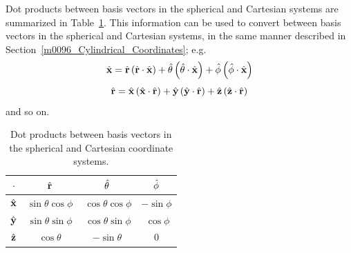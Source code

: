 Dot products between basis vectors in the spherical and Cartesian systems are summarized in Table~\ref{m0097_tBasisVectorConversion}.
This information can be used to convert between basis vectors in the spherical and Cartesian systems, in the same manner described in Section~\ref{m0096_Cylindrical_Coordinates}; e.g.
%
\begin{equation}
\hat{\bf x} = \hat{\bf r     }\left(\hat{\bf r     }\cdot\hat{\bf x}\right) 
             +\hat{\bf \theta}\left(\hat{\bf \theta}\cdot\hat{\bf x}\right)
             +\hat{\bf \phi  }\left(\hat{\bf \phi  }\cdot\hat{\bf x}\right)
\end{equation}
%
\begin{equation}
\hat{\bf r} = \hat{\bf x}\left(\hat{\bf x}\cdot\hat{\bf r}\right) 
             +\hat{\bf y}\left(\hat{\bf y}\cdot\hat{\bf r}\right)
             +\hat{\bf z}\left(\hat{\bf z}\cdot\hat{\bf r}\right)
\end{equation}
%
and so on.
% 
%
\begin{table}
\begin{center}
\begin{tabular}{c|ccc}
$\cdot$       & $\hat{\bf r}$ & $\hat{\bf \theta}$ & $\hat{\bf \phi}$ \\
\hline
$\hat{\bf x}$ & $\sin\theta\cos\phi$ & $~\cos\theta\cos\phi$ & $-\sin\phi$ \\
$\hat{\bf y}$ & $\sin\theta\sin\phi$ & $~\cos\theta\sin\phi$ & $~\cos\phi$ \\
$\hat{\bf z}$ & $\cos\theta$         & $-\sin\theta$         & 0 \\
\end{tabular}
\end{center}
\caption{\label{m0097_tBasisVectorConversion}Dot products between basis vectors in the spherical and Cartesian coordinate systems.}
\end{table}


